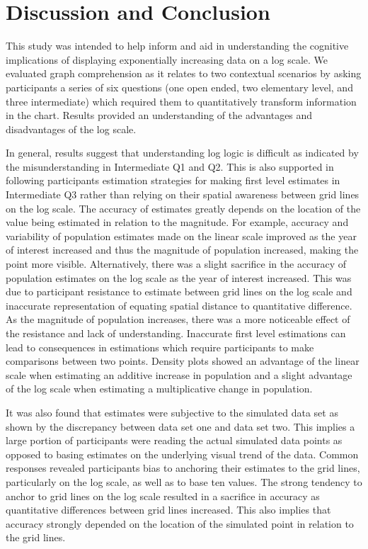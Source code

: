 \documentclass[print]{nuthesis}
\begin{document}
\hypertarget{discussion-and-conclusion-2}{%
\section{Discussion and Conclusion}\label{discussion-and-conclusion-2}}

This study was intended to help inform and aid in understanding the cognitive implications of displaying exponentially increasing data on a log scale.
We evaluated graph comprehension as it relates to two contextual scenarios by asking participants a series of six questions (one open ended, two elementary level, and three intermediate) which required them to quantitatively transform information in the chart.
Results provided an understanding of the advantages and disadvantages of the log scale.

In general, results suggest that understanding log logic is difficult as indicated by the misunderstanding in Intermediate Q1 and Q2.
This is also supported in following participants estimation strategies for making first level estimates in Intermediate Q3 rather than relying on their spatial awareness between grid lines on the log scale.
The accuracy of estimates greatly depends on the location of the value being estimated in relation to the magnitude.
For example, accuracy and variability of population estimates made on the linear scale improved as the year of interest increased and thus the magnitude of population increased, making the point more visible.
Alternatively, there was a slight sacrifice in the accuracy of population estimates on the log scale as the year of interest increased.
This was due to participant resistance to estimate between grid lines on the log scale and inaccurate representation of equating spatial distance to quantitative difference.
As the magnitude of population increases, there was a more noticeable effect of the resistance and lack of understanding.
Inaccurate first level estimations can lead to consequences in estimations which require participants
to make comparisons between two points.
Density plots showed an advantage of the linear scale when estimating an additive increase in population and a slight advantage of the log scale when estimating a multiplicative change in population.

It was also found that estimates were subjective to the simulated data set as shown by the discrepancy between data set one and data set two.
This implies a large portion of participants were reading the actual simulated data points as opposed to basing estimates on the underlying visual trend of the data.
Common responses revealed participants bias to anchoring their estimates to the grid lines, particularly on the log scale, as well as to base ten values.
The strong tendency to anchor to grid lines on the log scale resulted in a sacrifice in accuracy as quantitative differences between grid lines increased.
This also implies that accuracy strongly depended on the location of the simulated point in relation to the grid lines.
\end{document}
